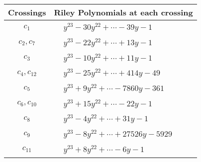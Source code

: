 \documentclass[1p]{elsarticle_modified}
\theoremstyle{definition}
\begin{document}
\begin{tabular}{m{50pt}|m{274pt}}
Crossings & \hspace{64pt}Riley Polynomials at each crossing \\
\hline $$\begin{aligned}c_{1}\end{aligned}$$&$\begin{aligned}
&y^{23}-30 y^{22}+\cdots-39 y-1
\end{aligned}$\\
\hline $$\begin{aligned}c_{2},c_{7}\end{aligned}$$&$\begin{aligned}
&y^{23}-22 y^{22}+\cdots+13 y-1
\end{aligned}$\\
\hline $$\begin{aligned}c_{3}\end{aligned}$$&$\begin{aligned}
&y^{23}-10 y^{22}+\cdots+11 y-1
\end{aligned}$\\
\hline $$\begin{aligned}c_{4},c_{12}\end{aligned}$$&$\begin{aligned}
&y^{23}-25 y^{22}+\cdots+414 y-49
\end{aligned}$\\
\hline $$\begin{aligned}c_{5}\end{aligned}$$&$\begin{aligned}
&y^{23}+9 y^{22}+\cdots-7860 y-361
\end{aligned}$\\
\hline $$\begin{aligned}c_{6},c_{10}\end{aligned}$$&$\begin{aligned}
&y^{23}+15 y^{22}+\cdots-22 y-1
\end{aligned}$\\
\hline $$\begin{aligned}c_{8}\end{aligned}$$&$\begin{aligned}
&y^{23}-4 y^{22}+\cdots+31 y-1
\end{aligned}$\\
\hline $$\begin{aligned}c_{9}\end{aligned}$$&$\begin{aligned}
&y^{23}-8 y^{22}+\cdots+27526 y-5929
\end{aligned}$\\
\hline $$\begin{aligned}c_{11}\end{aligned}$$&$\begin{aligned}
&y^{23}+8 y^{22}+\cdots-6 y-1
\end{aligned}$\\
\hline
\end{tabular}\\~\\
\end{document}
